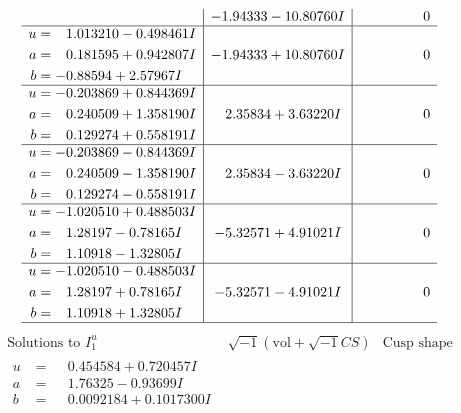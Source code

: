 \documentclass[1p]{elsarticle_modified}
\theoremstyle{definition}
\newcommand{\I}{\sqrt{-1}}
\begin{document}
$$\begin{array}{c|c|c}
 & -1.94333 - 10.80760 I & \phantom{-0.000000 } 0 \\ \hline\begin{aligned}
u &= \phantom{-}1.013210 - 0.498461 I \\
a &= \phantom{-}0.181595 + 0.942807 I \\
b &= -0.88594 + 2.57967 I\end{aligned}
 & -1.94333 + 10.80760 I & \phantom{-0.000000 } 0 \\ \hline\begin{aligned}
u &= -0.203869 + 0.844369 I \\
a &= \phantom{-}0.240509 + 1.358190 I \\
b &= \phantom{-}0.129274 + 0.558191 I\end{aligned}
 & \phantom{-}2.35834 + 3.63220 I & \phantom{-0.000000 } 0 \\ \hline\begin{aligned}
u &= -0.203869 - 0.844369 I \\
a &= \phantom{-}0.240509 - 1.358190 I \\
b &= \phantom{-}0.129274 - 0.558191 I\end{aligned}
 & \phantom{-}2.35834 - 3.63220 I & \phantom{-0.000000 } 0 \\ \hline\begin{aligned}
u &= -1.020510 + 0.488503 I \\
a &= \phantom{-}1.28197 - 0.78165 I \\
b &= \phantom{-}1.10918 - 1.32805 I\end{aligned}
 & -5.32571 + 4.91021 I & \phantom{-0.000000 } 0 \\ \hline\begin{aligned}
u &= -1.020510 - 0.488503 I \\
a &= \phantom{-}1.28197 + 0.78165 I \\
b &= \phantom{-}1.10918 + 1.32805 I\end{aligned}
 & -5.32571 - 4.91021 I & \phantom{-0.000000 } 0\\
 \hline 
 \end{array}$$\newpage$$\begin{array}{c|c|c}  
\text{Solutions to }I^u_{1}& \I (\text{vol} + \sqrt{-1}CS) & \text{Cusp shape}\\
 \hline 
\begin{aligned}
u &= \phantom{-}0.454584 + 0.720457 I \\
a &= \phantom{-}1.76325 - 0.93699 I \\
b &= \phantom{-}0.0092184 + 0.1017300 I\end{aligned}

\end{array}$$
\end{document}
